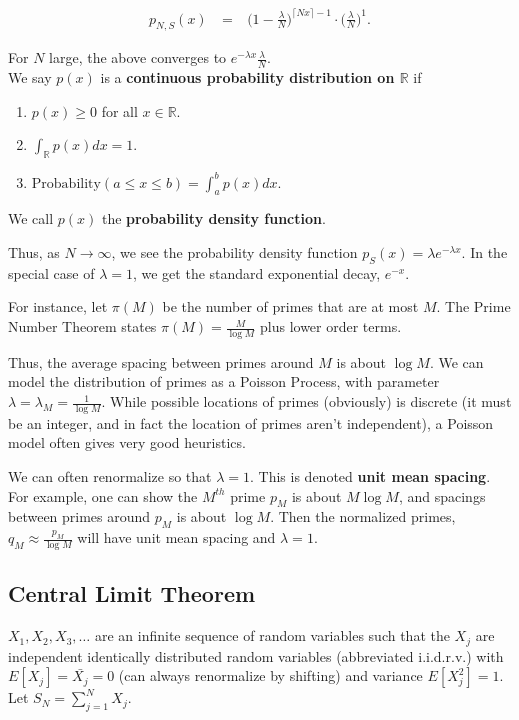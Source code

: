 \documentclass[12pt,letterpaper]{report}
\newcommand\bea{\begin{eqnarray}}
\newcommand\eea{\end{eqnarray}}
\newcommand\ben{\begin{enumerate}}
\newcommand\een{\end{enumerate}}
\newcommand{\R}{\ensuremath{\mathbb{R}}}
\begin{document}
\bea p_{N,S}(x) & \ = \ & \Bigg(1 - \frac{\lambda}{N}
\Bigg)^{\lceil Nx \rceil - 1} \cdot \Bigg( \frac{\lambda}{N}
\Bigg)^1. \eea

For $N$ large, the above converges to $e^{-\lambda x}
\frac{\lambda}{N}$. \\

We say $p(x)$ is a \textbf{continuous probability distribution on
$\R$} if

\ben
\item $p(x) \ge 0$ for all $x \in \R$.
\item $\int_{\R} p(x)dx = 1$.
\item $\mbox{Probability}(a \le x \le b) = \int_a^b p(x)dx$.
\een

We call $p(x)$ the \textbf{probability density function}.

Thus, as $N \rightarrow \infty$, we see the probability density
function $p_S(x) = \lambda e^{-\lambda x}$. In the special case of
$\lambda = 1$, we get the standard exponential decay, $e^{-x}$.

For instance, let $\pi(M)$ be the number of primes that are at
most $M$. The Prime Number Theorem states $\pi(M) = \frac{M}{\log
M}$ plus lower order terms.

Thus, the average spacing between primes around $M$ is about $\log
M$. We can model the distribution of primes as a Poisson Process,
with parameter $\lambda = \lambda_M = \frac{1}{\log M}$. While
possible locations of primes (obviously) is discrete (it must be
an integer, and in fact the location of primes aren't
independent), a Poisson model often gives very good heuristics.

We can often renormalize so that $\lambda = 1$. This is denoted
\textbf{unit mean spacing}. For example, one can show the $M^{th}$
prime $p_M$ is about $M \log M$, and spacings between primes
around $p_M$ is about $\log M$. Then the normalized primes, $q_M
\approx \frac{p_M}{\log M}$ will have unit mean spacing and
$\lambda = 1$.


\subsection{Central Limit Theorem} $X_1, X_2, X_3, \dots $ are an
infinite sequence of random variables such that the $X_j$ are
independent identically distributed random variables (abbreviated
i.i.d.r.v.) with $E[X_j] = \bar{X_j} = 0$ (can always renormalize
by shifting) and variance $E[X_j^2] = 1$. Let $S_N = \sum_{j=1}^N
X_j$.
\end{document}
